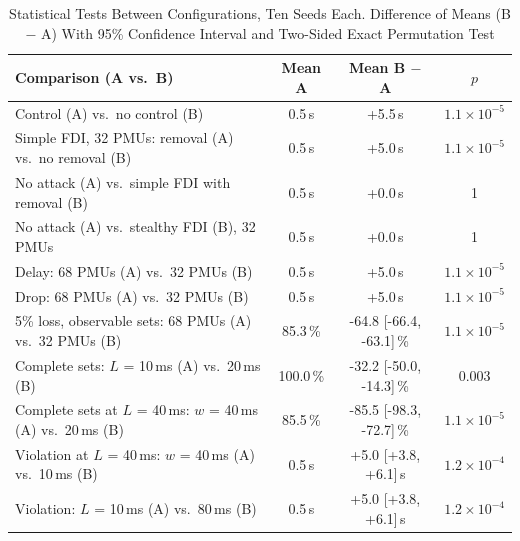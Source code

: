\begin{table}[t]
\caption{Statistical Tests Between Configurations, Ten Seeds Each. Difference of Means (B $-$ A) With 95\% Confidence Interval and Two-Sided Exact Permutation Test}
\label{tab:stats}
\centering
\footnotesize
\setlength{\tabcolsep}{3pt}
\begin{tabular}{@{}P{3.3cm}ccc@{}}
\toprule
Comparison (A vs.\ B) & Mean A & Mean B $-$ A & $p$ \\
\midrule
Control (A) vs.\ no control (B) & 0.5\,s & +5.5\,s & $1.1\times10^{-5}$ \\
Simple FDI, 32 PMUs: removal (A) vs.\ no removal (B) & 0.5\,s & +5.0\,s & $1.1\times10^{-5}$ \\
No attack (A) vs.\ simple FDI with removal (B) & 0.5\,s & +0.0\,s & 1 \\
No attack (A) vs.\ stealthy FDI (B), 32 PMUs & 0.5\,s & +0.0\,s & 1 \\
Delay: 68 PMUs (A) vs.\ 32 PMUs (B) & 0.5\,s & +5.0\,s & $1.1\times10^{-5}$ \\
Drop: 68 PMUs (A) vs.\ 32 PMUs (B) & 0.5\,s & +5.0\,s & $1.1\times10^{-5}$ \\
5\% loss, observable sets: 68 PMUs (A) vs.\ 32 PMUs (B) & 85.3\,\% & -64.8 [-66.4, -63.1]\,\% & $1.1\times10^{-5}$ \\
Complete sets: $L$ = 10\,ms (A) vs.\ 20\,ms (B) & 100.0\,\% & -32.2 [-50.0, -14.3]\,\% & 0.003 \\
Complete sets at $L$ = 40\,ms: $w$ = 40\,ms (A) vs.\ 20\,ms (B) & 85.5\,\% & -85.5 [-98.3, -72.7]\,\% & $1.1\times10^{-5}$ \\
Violation at $L$ = 40\,ms: $w$ = 40\,ms (A) vs.\ 10\,ms (B) & 0.5\,s & +5.0 [+3.8, +6.1]\,s & $1.2\times10^{-4}$ \\
Violation: $L$ = 10\,ms (A) vs.\ 80\,ms (B) & 0.5\,s & +5.0 [+3.8, +6.1]\,s & $1.2\times10^{-4}$ \\
\bottomrule
\end{tabular}
\end{table}
